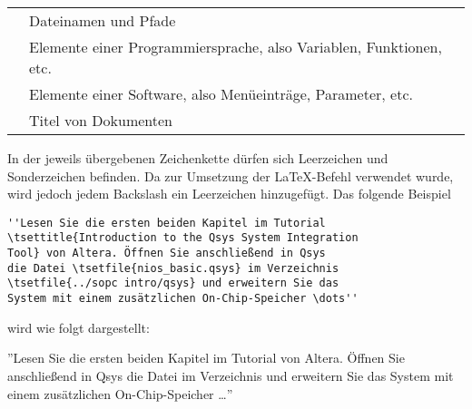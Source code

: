 \documentclass[a4paper,12pt]{article}
\begin{document}
\begin{tabular}{r l}
\tsetprog{\tsetfile} & Dateinamen und Pfade\\
\tsetprog{\tsetprog} & Elemente einer Programmiersprache, also Variablen, Funktionen, etc. \\
\tsetprog{\tsetsw} & Elemente einer Software, also Menüeinträge, Parameter, etc.\\
\tsetprog{\tsettitle} & Titel von Dokumenten \\
\end{tabular}

In der jeweils übergebenen Zeichenkette dürfen sich Leerzeichen und Sonderzeichen befinden. Da zur Umsetzung der {\LaTeX}-Befehl \tsetprog{\detokenize}verwendet wurde, wird jedoch jedem Backslash ein Leerzeichen hinzugefügt. Das folgende Beispiel

\begin{verbatim}
''Lesen Sie die ersten beiden Kapitel im Tutorial
\tsettitle{Introduction to the Qsys System Integration
Tool} von Altera. Öffnen Sie anschließend in Qsys 
die Datei \tsetfile{nios_basic.qsys} im Verzeichnis 
\tsetfile{../sopc intro/qsys} und erweitern Sie das 
System mit einem zusätzlichen On-Chip-Speicher \dots''
\end{verbatim}

wird wie folgt dargestellt:

''Lesen Sie die ersten beiden Kapitel im Tutorial  von Altera. Öffnen Sie anschließend in Qsys die Datei  im Verzeichnis 
 und erweitern Sie das System mit einem zusätzlichen On-Chip-Speicher \dots''

\label{sec:LastPage}
\end{document}
